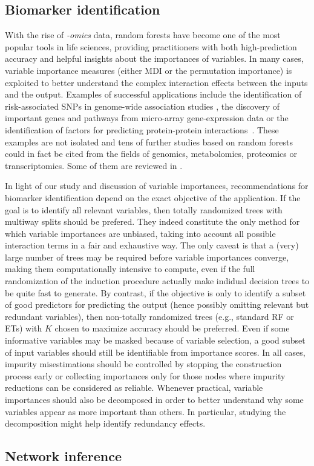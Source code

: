 \subsection{Biomarker identification}

With the rise of \textit{-omics} data, random forests have become one of the
most popular tools in life sciences, providing practitioners with both
high-prediction accuracy and helpful insights about the importances of variables. In
many cases, variable importance measures (either MDI or the permutation
importance) is exploited to better understand the complex interaction effects
between the inputs and the output. Examples of successful applications include
the identification of risk-associated SNPs in genome-wide association studies
\citep{lunetta:2004,meng:2009,botta:2014}, the discovery of important genes and
pathways from micro-array gene-expression data \citep{pang:2006,chang:2008} or
the identification of factors for predicting protein-protein
interactions~\citep{qi:2006}. These examples are not isolated and tens of
further studies based on random forests could in fact be cited from the fields
of genomics, metabolomics, proteomics or transcriptomics. Some of them are
reviewed in \citep{touw:2013,boulesteix:2012}.

In light of our study and discussion of variable importances,  recommendations
for biomarker identification depend on the exact objective of the application.
If the goal is to identify all relevant variables, then totally randomized
trees with multiway splits should be prefered. They indeed constitute the only
method for which variable importances are unbiased, taking into account all
possible interaction terms in a fair and exhaustive way. The only caveat is
that a (very) large number of trees may be required before variable importances
converge, making them computationally intensive to compute, even if the full
randomization of the induction procedure actually make indidual decision trees
to be quite fast to generate.  By contrast, if the objective is only to
identify a subset of good predictors for predicting the output (hence possibly
omitting relevant but redundant variables), then non-totally randomized trees
(e.g., standard RF or ETs) with $K$ chosen to maximize accuracy should be
preferred. Even if some informative variables may be masked because of variable
selection, a good subset of input variables should still be identifiable from
importance scores. In all cases, impurity misestimations should be controlled
by stopping the construction process early or collecting importances only for
those nodes where impurity reductions can be considered as reliable. Whenever
practical, variable importances should also be decomposed in order to better
understand why some variables appear as more important than others. In
particular, studying the decomposition might help identify redundancy effects.

\subsection{Network inference}
\todo{}

